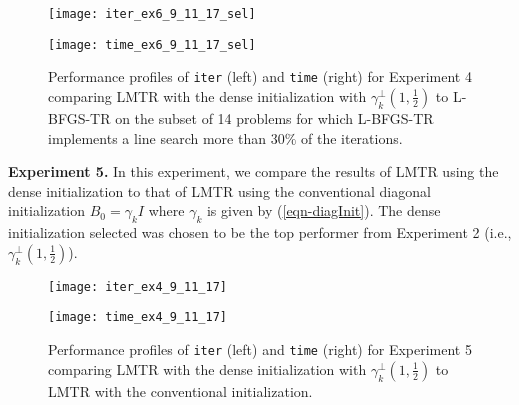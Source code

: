  
 \begin{figure*}[h!]
                        \begin{minipage}{0.48\textwidth}
                                \texttt{[image: iter\_ex6\_9\_11\_17\_sel]}
                                
                        \end{minipage}
                        \hfill
                        \begin{minipage}{0.48\textwidth}
                                                \texttt{[image: time\_ex6\_9\_11\_17\_sel]}
                                
                        \end{minipage}
                        \caption{Performance profiles of 
                        \texttt{iter} (left) and
\texttt{time} (right) for Experiment 4
                        comparing  LMTR with the dense initialization
with 
$\gamma_k^{\perp}(1,\frac{1}{2})$
 to L-BFGS-TR
on the subset of 14 problems for which L-BFGS-TR implements a line search more than $30\% $  of the iterations.}
                \label{fig:exp6-sel}       
                \end{figure*}

\bigskip
\noindent
{\bf Experiment 5.}  In this experiment, we compare the results of {\small LMTR} using the 
dense initialization to that of {\small LMTR} using the conventional diagonal initialization $B_0=\gamma_k I$ where $\gamma_k$ is given by  (\ref{eqn-diagInit}).  The dense initialization selected
was chosen to be the top performer from Experiment 2 (i.e.,
$\gamma_k^{\perp}(1,\frac{1}{2})$).

  \begin{figure*}[h!]
                        \begin{minipage}{0.48\textwidth}
                                \texttt{[image: iter\_ex4\_9\_11\_17]}
                                
                        \end{minipage}
                        \hfill
                        \begin{minipage}{0.48\textwidth}
                                                \texttt{[image: time\_ex4\_9\_11\_17]}
                                                
                        \end{minipage}
                        \caption{Performance profiles of 
                        \texttt{iter} (left) and
\texttt{time} (right) for Experiment 5 comparing LMTR with the dense initialization
with
$\gamma_k^{\perp}(1,\frac{1}{2})$
 to LMTR with the conventional initialization.}
                \label{fig:compinitial}      
\end{figure*}

